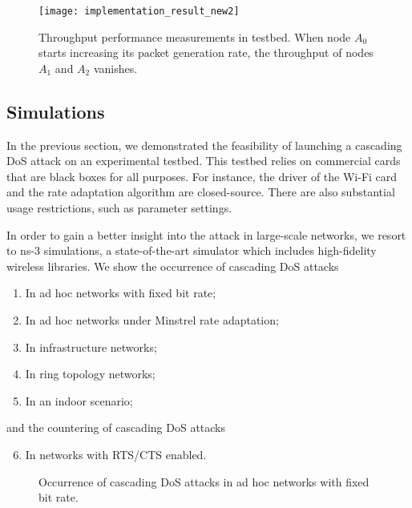 \documentclass{IEEEtran}
\begin{document}
\begin{figure}[!t]
\centering
\texttt{[image: implementation\_result\_new2]}
\caption{Throughput performance measurements in testbed. When node
  $A_0$ starts increasing its packet generation rate, the throughput of nodes $A_1$
  and $A_2$ vanishes.}
\label{implementation_result}
\end{figure}


\subsection{Simulations}
\label{Simulations}
In the previous section, we demonstrated the
feasibility of launching a cascading DoS attack on an experimental
testbed. This testbed relies on commercial cards that are
black boxes for all purposes.  For instance, the driver of the Wi-Fi card
and the rate adaptation algorithm are closed-source. There are also
substantial usage restrictions, such as parameter settings.

In order to gain a better insight into the
attack in large-scale networks, we resort to ns-3 simulations, a state-of-the-art simulator which includes high-fidelity wireless libraries. We show
the occurrence of cascading DoS attacks
\begin{enumerate}
\item In ad hoc networks with fixed bit rate;
  \item In ad hoc networks under Minstrel rate adaptation;
  \item In infrastructure networks;
  \item In ring topology networks;
  \item In an indoor scenario;
\end{enumerate}
and the countering of cascading DoS attacks
\begin{enumerate}
  \setcounter{enumi}{5}
  \item In networks with RTS/CTS enabled.
\end{enumerate}

\begin{figure}[!t]
\centering
{}
\vfil {}
\caption{Occurrence of cascading DoS attacks in ad hoc networks with fixed bit rate.}
\label{The occurrence of cascading DoS attack in adhoc networks with fixed bitrate}
\end{figure}
\end{document}
